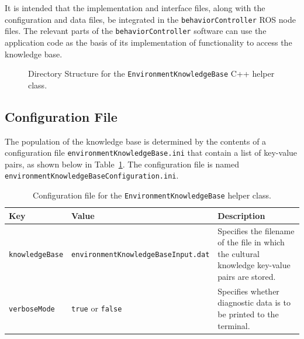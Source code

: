\documentclass{CSSRforAfrica}
\begin{document}
It is intended that the implementation and interface files, along with the configuration and data files, be integrated in the {\small \tt behaviorController} ROS node files.  The relevant parts of the {\small \tt behaviorController} software can use the application code as the basis of its implementation of functionality to access the knowledge base.


\begin{figure}[thb]
\caption{Directory Structure for the {\tt \small EnvironmentKnowledgeBase}  C++ helper class.}
\label{fig:directory_structure_utilities}
\end{figure}



\subsection{Configuration File}
The population of the knowledge base is determined by the contents of a configuration file
{\tt \small environmentKnowledgeBase.ini}  that  contain a list of key-value pairs, as shown below in Table~\ref{tab:config_file}.
The configuration file is named {\tt\small environmentKnowledgeBaseConfiguration.ini}.

 
\begin{table} [H]
\caption{Configuration file for the {\tt \small EnvironmentKnowledgeBase} helper class.} 
\label{tab:config_file}
\begin{tabularx}{\linewidth}{|l|l|X|}
    \hline
    \rowcolor{gray!30}
    \small{\textbf{Key}} & \small{\textbf{Value}} & \small{\textbf{Description}} \\ \hline
    \footnotesize{\texttt{knowledgeBase}} & \footnotesize{\texttt{environmentKnowledgeBaseInput.dat}}  & \footnotesize{Specifies the filename of the file in which the cultural knowledge key-value pairs  are stored.} \\ \hline
    \footnotesize{\texttt{verboseMode}} & \footnotesize{\texttt{true}} or \texttt{false} & \footnotesize{Specifies whether diagnostic data is to be printed to the terminal.} \\ \hline
\end{tabularx}
\end{table}
\end{document}
